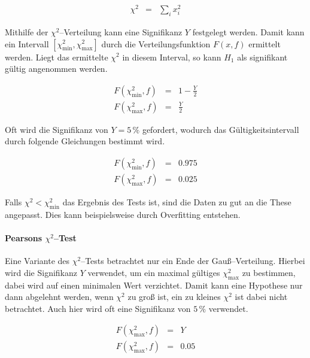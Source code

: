 \documentclass[12pt,a4paper]{scrartcl}
\numberwithin{equation}{section} %
\renewcommand{\[}{} %
\renewcommand{\]}{\noindent} %
\begin{document}
\[
\begin{eqnarray}
    \chi^2 &=& \sum_i x_i^2
\end{eqnarray}
\]

Mithilfe der \(\chi^2\)--Verteilung kann eine Signifikanz \(Y\)
festgelegt werden. Damit kann ein Intervall
\([\chi^2_\mathrm{min}, \chi^2_\mathrm{max}]\) durch die
Verteilungsfunktion \(F(x, f)\) ermittelt werden. Liegt das ermittelte
\(\chi^2\) in diesem Interval, so kann \(H_1\) als signifikant gültig
angenommen werden.

\[
\begin{eqnarray}
    F(\chi^2_\mathrm{min}, f) &=& 1 - \frac{Y}{2} \\
    F(\chi^2_\mathrm{max}, f) &=& \frac{Y}{2}
\end{eqnarray}
\]

Oft wird die Signifikanz von \(Y=5\,\%\) gefordert, wodurch das
Gültigkeitsintervall durch folgende Gleichungen bestimmt wird.

\[
\begin{eqnarray}
    F(\chi^2_\mathrm{min}, f) &=& 0.975 \label{eq:ChiMinFormula} \\
    F(\chi^2_\mathrm{max}, f) &=& 0.025 \label{eq:ChiMaxFormula}
\end{eqnarray}
\]

Falls \(\chi^2<\chi^2_\mathrm{min}\) das Ergebnis des Tests ist, sind
die Daten zu gut an die These angepasst. Dies kann beispielsweise durch
Overfitting entstehen.

\hypertarget{pearsons-chi2test}{%
\paragraph{\texorpdfstring{Pearsons
\(\chi^2\)--Test}{Pearsons \textbackslash chi\^{}2--Test}}\label{pearsons-chi2test}}

Eine Variante des \(\chi^2\)--Tests betrachtet nur ein Ende der
Gauß--Verteilung. Hierbei wird die Signifikanz \(Y\) verwendet, um ein
maximal gültiges \(\chi_\mathrm{max}^2\) zu bestimmen, dabei wird auf
einen minimalen Wert verzichtet. \cite{McHugh} Damit kann eine Hypothese
nur dann abgelehnt werden, wenn \(\chi^2\) zu groß ist, ein zu kleines
\(\chi^2\) ist dabei nicht betrachtet. Auch hier wird oft eine
Signifikanz von \(5\,\%\) verwendet.

\[
\begin{eqnarray}
    F(\chi^2_\mathrm{max}, f) &=& Y \\
    F(\chi^2_\mathrm{max}, f) &=& 0.05 \label{eq:ChiMaxPearson} \\
\end{eqnarray}
\]
\end{document}
